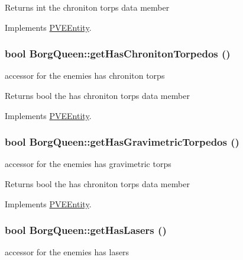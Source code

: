 \begin{DoxyReturn}{Returns}
int the chroniton torps data member 
\end{DoxyReturn}


Implements \hyperlink{classPVEEntity}{PVEEntity}.

\hypertarget{classBorgQueen_a22291a2f8d58dbb517975f490ea6bad2}{
\subsubsection[{getHasChronitonTorpedos}]{\setlength{\rightskip}{0pt plus 5cm}bool BorgQueen::getHasChronitonTorpedos ()}}
\label{d6/d8d/classBorgQueen_a22291a2f8d58dbb517975f490ea6bad2}
accessor for the enemies has chroniton torps

\begin{DoxyReturn}{Returns}
bool the has chroniton torps data member 
\end{DoxyReturn}


Implements \hyperlink{classPVEEntity}{PVEEntity}.

\hypertarget{classBorgQueen_ade43bf6397423dd698087c19ecd28707}{
\subsubsection[{getHasGravimetricTorpedos}]{\setlength{\rightskip}{0pt plus 5cm}bool BorgQueen::getHasGravimetricTorpedos ()}}
\label{d6/d8d/classBorgQueen_ade43bf6397423dd698087c19ecd28707}
accessor for the enemies has gravimetric torps

\begin{DoxyReturn}{Returns}
bool the has chroniton torps data member 
\end{DoxyReturn}


Implements \hyperlink{classPVEEntity}{PVEEntity}.

\hypertarget{classBorgQueen_a66488c3adb0ae7603d97acd1cae540d5}{
\subsubsection[{getHasLasers}]{\setlength{\rightskip}{0pt plus 5cm}bool BorgQueen::getHasLasers ()}}
\label{d6/d8d/classBorgQueen_a66488c3adb0ae7603d97acd1cae540d5}
accessor for the enemies has lasers

